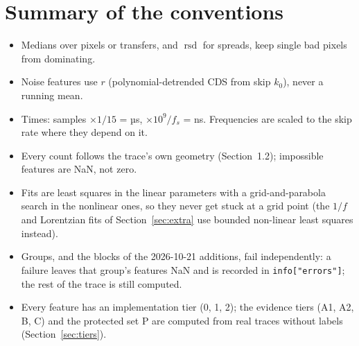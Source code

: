 \documentclass[10pt]{article}
\newcommand{\code}[1]{\texttt{#1}}
\newcommand{\rsd}{\operatorname{rsd}}
\newcommand{\ko}{k_0}
\begin{document}
\section{Summary of the conventions}
\begin{itemize}
\item Medians over pixels or transfers, and $\rsd$ for spreads, keep single bad pixels from dominating.
\item Noise features use $r$ (polynomial-detrended CDS from skip $\ko$), never a running mean.
\item Times: samples $\times 1/15$ = µs, $\times 10^9/f_s$ = ns. Frequencies are scaled to the skip rate where they depend on it.
\item Every count follows the trace's own geometry (Section~1.2); impossible features are NaN, not zero.
\item Fits are least squares in the linear parameters with a grid-and-parabola search in the nonlinear ones, so they never get stuck
  at a grid point (the $1/f$ and Lorentzian fits of Section~\ref{sec:extra} use bounded non-linear least squares instead).
\item Groups, and the blocks of the 2026-10-21 additions, fail independently: a failure leaves that group's features NaN and is recorded in
  \code{info["errors"]}; the rest of the trace is still computed.
\item Every feature has an implementation tier (0, 1, 2); the evidence tiers (A1, A2, B, C) and the protected set P are computed from
  real traces without labels (Section~\ref{sec:tiers}).
\end{itemize}
\end{document}
